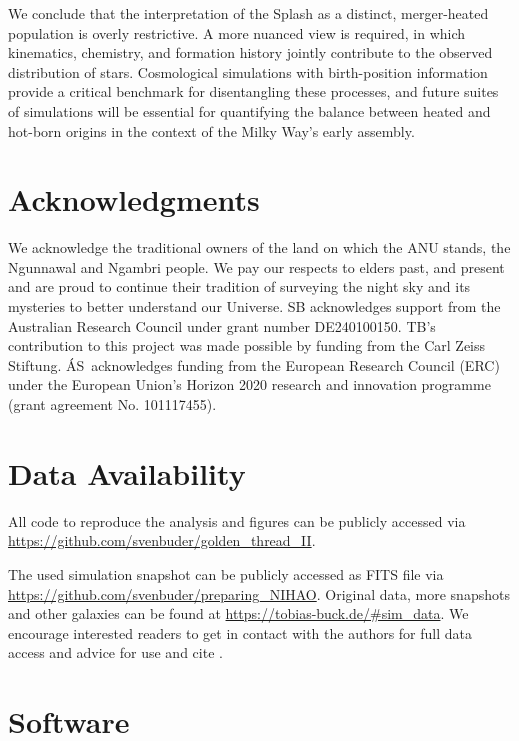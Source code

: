\documentclass[fleqn,usenatbib]{mnras}
\begin{document}
We conclude that the interpretation of the Splash as a distinct, merger-heated population is overly restrictive. A more nuanced view is required, in which kinematics, chemistry, and formation history jointly contribute to the observed distribution of stars. Cosmological simulations with birth-position information provide a critical benchmark for disentangling these processes, and future suites of simulations will be essential for quantifying the balance between heated and hot-born origins in the context of the Milky Way’s early assembly.

\section*{Acknowledgments}

We acknowledge the traditional owners of the land on which the ANU stands, the Ngunnawal and Ngambri people. We pay our respects to elders past, and present and are proud to continue their tradition of surveying the night sky and its mysteries to better understand our Universe. SB acknowledges support from the Australian Research Council under grant number DE240100150.
TB's contribution to this project was made possible by funding from the Carl Zeiss Stiftung. \'{A}S~acknowledges funding from the European Research Council (ERC) under the European Union’s Horizon 2020 research and innovation programme (grant agreement No. 101117455).

\section*{Data Availability}

All code to reproduce the analysis and figures can be publicly accessed via \url{https://github.com/svenbuder/golden_thread_II}.

The used simulation snapshot can be publicly accessed as FITS file via \url{https://github.com/svenbuder/preparing_NIHAO}. Original data, more snapshots and other galaxies can be found at \url{https://tobias-buck.de/#sim_data}. We encourage interested readers to get in contact with the authors for full data access and advice for use and cite \citet{Buck2020b, Buck2021}.

\section*{Software}
\end{document}
